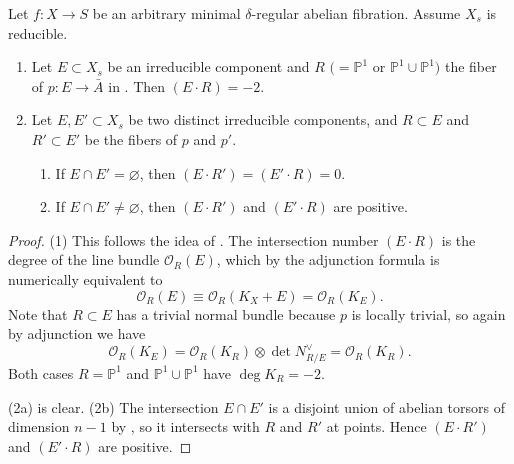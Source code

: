 \documentclass[reqno, letterpaper]{amsart}
\numberwithin{equation}{subsection}
\let\emptyset\varnothing
\let\to\longrightarrow
\newcommand{\PP}{\mathbb{P}}
\begin{document}
		\begin{lemma} \label{lem:intersection number}
			Let $f : X \to S$ be an arbitrary minimal $\delta$-regular abelian fibration. Assume $X_s$ is reducible.
			\begin{enumerate}
				\item Let $E \subset X_s$ be an irreducible component and $R$ $(=\PP^1$ or $\PP^1 \cup \PP^1)$ the fiber of $p : E \to \bar A$ in . Then $(E \cdot R) = -2$.
				
				\item Let $E, E' \subset X_s$ be two distinct irreducible components, and $R \subset E$ and $R' \subset E'$ be the fibers of $p$ and $p'$.
				\begin{enumerate}
					\item If $E \cap E' = \emptyset$, then $(E \cdot R') = (E' \cdot R) = 0$.
					\item If $E \cap E' \neq \emptyset$, then $(E \cdot R')$ and $(E' \cdot R)$ are positive.
				\end{enumerate}
			\end{enumerate}
		\end{lemma}
		\begin{proof}
			(1) This follows the idea of \cite[Proposition~4.9]{hwang-ogu09}. The intersection number $(E \cdot R)$ is the degree of the line bundle $\mathcal O_R(E)$, which by the adjunction formula is numerically equivalent to
			\[ \mathcal O_R(E) \equiv \mathcal O_R (K_X + E) = \mathcal O_R(K_E) .\]
			Note that $R \subset E$ has a trivial normal bundle because $p$ is locally trivial, so again by adjunction we have
			\[ \mathcal O_R(K_E) = \mathcal O_R(K_R) \otimes \det N_{R/E}^{\vee} = \mathcal O_R(K_R) .\]
			Both cases $R = \PP^1$ and $\PP^1 \cup \PP^1$ have $\deg K_R = -2$.
			
			\medskip
			
			(2a) is clear. (2b) The intersection $E \cap E'$ is a disjoint union of abelian torsors of dimension $n-1$ by , so it intersects with $R$ and $R'$ at points. Hence $(E \cdot R')$ and $(E' \cdot R)$ are positive.
		\end{proof}
		
\end{document}
